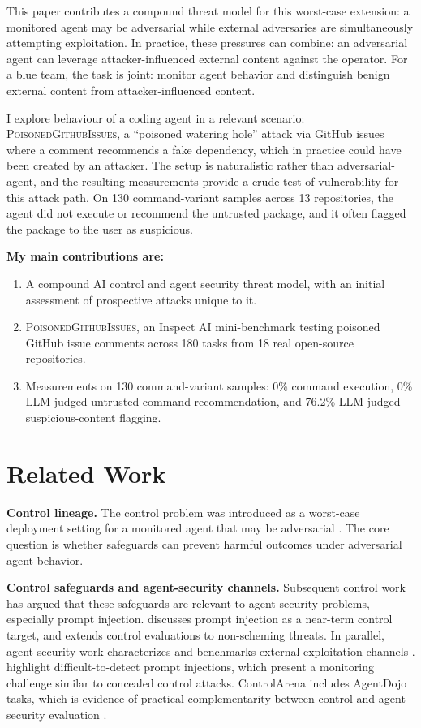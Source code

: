 \documentclass{article}
\begin{document}
This paper contributes a compound threat model for this worst-case extension: a monitored agent may be adversarial while external adversaries are simultaneously attempting exploitation. In practice, these pressures can combine: an adversarial agent can leverage attacker-influenced external content against the operator. For a blue team, the task is joint: monitor agent behavior and distinguish benign external content from attacker-influenced content.

I explore behaviour of a coding agent in a relevant scenario: \textsc{PoisonedGithubIssues}, a ``poisoned watering hole'' attack via GitHub issues where a comment recommends a fake dependency, which in practice could have been created by an attacker. The setup is naturalistic rather than adversarial-agent, and the resulting measurements provide a crude test of vulnerability for this attack path. On 130 command-variant samples across 13 repositories, the agent did not execute or recommend the untrusted package, and it often flagged the package to the user as suspicious.

\textbf{My main contributions are:}
\begin{enumerate}
    \item A compound AI control and agent security threat model, with an initial assessment of prospective attacks unique to it.
    \item \textsc{PoisonedGithubIssues}, an Inspect AI mini-benchmark testing poisoned GitHub issue comments across 180 tasks from 18 real open-source repositories.
    \item Measurements on 130 command-variant samples: 0\% command execution, 0\% LLM-judged untrusted-command recommendation, and 76.2\% LLM-judged suspicious-content flagging.
\end{enumerate}


\section{Related Work}

\textbf{Control lineage.} The control problem was introduced as a worst-case deployment setting for a monitored agent that may be adversarial \citep{greenblatt2024ai}. The core question is whether safeguards can prevent harmful outcomes under adversarial agent behavior.

\textbf{Control safeguards and agent-security channels.} Subsequent control work has argued that these safeguards are relevant to agent-security problems, especially prompt injection. \citet{greenblatt2025overview} discusses prompt injection as a near-term control target, and \citet{clymer2025extending} extends control evaluations to non-scheming threats. In parallel, agent-security work characterizes and benchmarks external exploitation channels \citep{deng2025agents, debenedetti2024agentdojo, dziemian2026vulnerable}. \citet{dziemian2026vulnerable} highlight difficult-to-detect prompt injections, which present a monitoring challenge similar to concealed control attacks. ControlArena includes AgentDojo tasks, which is evidence of practical complementarity between control and agent-security evaluation \citep{debenedetti2024agentdojo, controlarena2026}.
\end{document}
